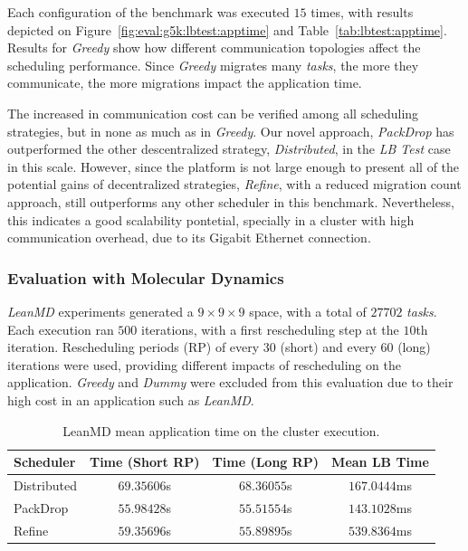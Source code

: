 
Each configuration of the benchmark was executed $15$ times, with results depicted on Figure~\ref{fig:eval:g5k:lbtest:apptime} and Table~\ref{tab:lbtest:apptime}.
Results for \textit{Greedy} show how different communication topologies affect the scheduling performance.
Since \textit{Greedy} migrates many \textit{tasks}, the more they communicate, the more migrations impact the application time.

The increased in communication cost can be verified among all scheduling strategies, but in none as much as in \textit{Greedy}.
Our novel approach, \textit{PackDrop} has outperformed the other descentralized strategy, \textit{Distributed}, in the \textit{LB Test} case in this scale.
However, since the platform is not large enough to present all of the potential gains of decentralized strategies, \textit{Refine}, with a reduced migration count approach, still outperforms any other scheduler in this benchmark.
Nevertheless, this indicates a good scalability pontetial, specially in a cluster with high communication overhead, due to its Gigabit Ethernet connection.

\subsubsection{Evaluation with Molecular Dynamics} \label{sec:cluster:md}

\textit{LeanMD} experiments generated a $9\times9\times9$ space, with a total of $27702$ \textit{tasks}.
Each execution ran $500$ iterations, with a first rescheduling step at the $10$th iteration. 
Rescheduling periods (RP) of every $30$ (short) and every $60$ (long) iterations were used, providing different impacts of rescheduling on the application.
\textit{Greedy} and \textit{Dummy} were excluded from this evaluation due to their high cost in an application such as \textit{LeanMD}. 

\begin{table}[!ht]
	\centering
	\caption{LeanMD mean application time on the cluster execution.}	
	\begin{tabular}{l|c c c}
	Scheduler & Time (Short RP) & Time (Long RP) & Mean LB Time \\ \hline
	Distributed & $69.35606$s & $68.36055$s & $167.0444$ms \\ 
	PackDrop & $55.98428$s & $55.51554$s & $143.1028$ms \\ 
	Refine & $59.35696$s & $55.89895$s & $539.8364$ms \\ 
	\end{tabular}
	\label{tab:eval:g5k:leanmd:time} 
\end{table}

